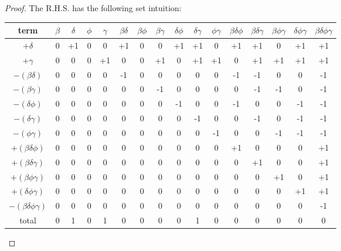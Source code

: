 \documentclass[manuscript]{acmart}
\begin{document}
\begin{proof}
        The R.H.S. has the following set intuition:

        \begin{center}
            \begin{tabular}{ |c|c|c|c|c|c|c|c|c|c|c|c|c|c|c|c| }
                \hline
                term & $\beta$ & $\delta$ & $\phi$ & $\gamma$ & 
                $\beta \delta$ & $\beta \phi$ & $\beta \gamma$ & 
                $\delta \phi$ & $\delta \gamma$ & $\phi \gamma$ &
                $\beta \delta \phi$ & $\beta \delta \gamma$ &
                $\beta \phi \gamma$ & $\delta \phi \gamma$ &
                $\beta \delta \phi \gamma$\\
                \hline
                $ + \delta$ & 0 & +1 & 0 & 0 & +1 & 0 & 0 & +1 & +1 & 0 & +1 & +1 & 0 & +1 & +1 \\
                \hline
                $ + \gamma$ & 0 & 0 & 0 & +1 & 0 & 0 & +1 & 0 & +1 & +1 & 0 & +1 & +1 & +1 & +1 \\
                \hline
                $- (\beta \delta)$ & 0 & 0 & 0 & 0 & -1 & 0 & 0 & 0 & 0 & 0 & -1 & -1 & 0 & 0 & -1 \\
                \hline
                $- (\beta \gamma)$ & 0 & 0 & 0 & 0 & 0 & 0 & -1 & 0 & 0 & 0 & 0 & -1 & -1 & 0 & -1 \\
                \hline
                $- (\delta \phi)$ & 0 & 0 & 0 & 0 & 0 & 0 & 0 & -1 & 0 & 0 & -1 & 0 & 0 & -1 & -1 \\
                \hline
                $- (\delta \gamma)$ & 0 & 0 & 0 & 0 & 0 & 0 & 0 & 0 & -1 & 0 & 0 & -1 & 0 & -1 & -1 \\
                \hline
                $- (\phi \gamma)$ & 0 & 0 & 0 & 0 & 0 & 0 & 0 & 0 & 0 & -1 & 0 & 0 & -1 & -1 & -1 \\
                \hline
                $+ (\beta \delta \phi)$ & 0 & 0 & 0 & 0 & 0 & 0 & 0 & 0 & 0 & 0 & +1 & 0 & 0 & 0 & +1 \\
                \hline
                $+ (\beta \delta \gamma)$ & 0 & 0 & 0 & 0 & 0 & 0 & 0 & 0 & 0 & 0 & 0 & +1 & 0 & 0 & +1 \\
                \hline
                $+ (\beta \phi \gamma)$ & 0 & 0 & 0 & 0 & 0 & 0 & 0 & 0 & 0 & 0 & 0 & 0 & +1 & 0 & +1 \\
                \hline
                $+ (\delta \phi \gamma)$ & 0 & 0 & 0 & 0 & 0 & 0 & 0 & 0 & 0 & 0 & 0 & 0 & 0 & +1 & +1 \\
                \hline
                $- (\beta \delta \phi \gamma)$ & 0 & 0 & 0 & 0 & 0 & 0 & 0 & 0 & 0 & 0 & 0 & 0 & 0 & 0 & -1 \\
                \hline
                total & 0 & 1 & 0 & 1 & 0 & 0 & 0 & 0 & 1 & 0 & 0 & 0 & 0 & 0 & 0 \\
                \hline
            \end{tabular}
        \end{center}


\end{proof}
\end{document}
